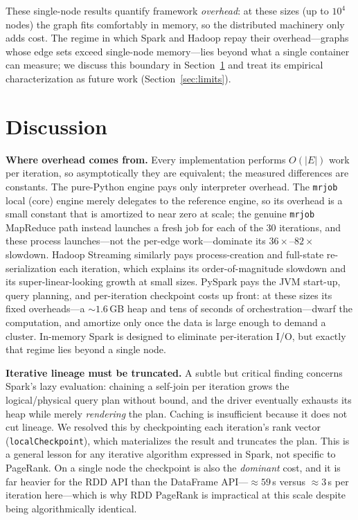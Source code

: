 These single-node results quantify framework \emph{overhead}: at these sizes (up
to $10^4$ nodes) the graph fits comfortably in memory, so the distributed
machinery only adds cost.
The regime in which Spark and Hadoop repay their overhead---graphs whose edge
sets exceed single-node memory---lies beyond what a single container can
measure; we discuss this boundary in Section~\ref{sec:discussion} and treat its
empirical characterization as future work (Section~\ref{sec:limits}).

\section{Discussion}
\label{sec:discussion}
\textbf{Where overhead comes from.} Every implementation performs $O(|E|)$ work
per iteration, so asymptotically they are equivalent; the measured differences
are constants. The pure-Python engine pays only interpreter overhead. The
\texttt{mrjob} local (core) engine merely delegates to the reference engine, so
its overhead is a small constant that is amortized to near zero at scale; the
genuine \texttt{mrjob} MapReduce path instead launches a fresh job for each of
the 30 iterations, and these process launches---not the per-edge work---dominate
its $36\times$--$82\times$ slowdown. Hadoop Streaming similarly pays
process-creation and full-state re-serialization each iteration, which explains
its order-of-magnitude slowdown and its super-linear-looking growth at small
sizes. PySpark pays the JVM start-up, query planning, and per-iteration
checkpoint costs up front: at these sizes its fixed overheads---a $\sim\!1.6$\,GB
heap and tens of seconds of orchestration---dwarf the computation, and amortize
only once the data is large enough to demand a cluster. In-memory Spark is
designed to eliminate per-iteration I/O, but exactly that regime lies beyond a
single node.

\textbf{Iterative lineage must be truncated.} A subtle but critical finding
concerns Spark's lazy evaluation: chaining a self-join per iteration grows the
logical/physical query plan without bound, and the driver eventually exhausts
its heap while merely \emph{rendering} the plan. Caching is insufficient because
it does not cut lineage. We resolved this by checkpointing each iteration's rank
vector (\texttt{localCheckpoint}), which materializes the result and truncates
the plan. This is a general lesson for any iterative algorithm expressed in
Spark, not specific to PageRank. On a single node the checkpoint is also the
\emph{dominant} cost, and it is far heavier for the RDD API than the DataFrame
API---$\approx\!59$\,s versus $\approx\!3$\,s per iteration here---which is why
RDD PageRank is impractical at this scale despite being algorithmically identical.

